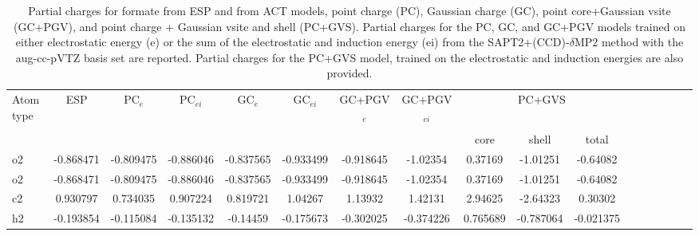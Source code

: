 \begin{sidewaystable}
\caption{Partial charges for formate from ESP and from ACT models, point charge (PC), Gaussian charge (GC), point core+Gaussian vsite (GC+PGV), and point charge + Gaussian vsite and shell (PC+GVS).  Partial charges for the PC, GC, and GC+PGV models trained on either electrostatic energy (e) or the sum of the electrostatic and induction energy (ei) from the SAPT2+(CCD)-$\delta$MP2 method with the aug-cc-pVTZ basis set are reported. Partial charges for the PC+GVS model, trained on the electrostatic and induction energies are also provided.}
\hspace{-1cm}
\begin{tabular}{lcccccccccccccccc}
\hline
 Atom type & ESP & PC$_{e}$ & PC$_{ei}$ & GC$_{e}$ & GC$_{ei}$ & GC+PGV$_{e}$ & GC+PGV$_{ei}$ & \multicolumn{3}{c}{PC+GVS} \\\\
 & & & & & & & & core & shell & total \\
\hline
 o2 & -0.868471 & -0.809475 & -0.886046 & -0.837565 &  -0.933499 & -0.918645 &  -1.02354 & 0.37169 & -1.01251 & -0.64082 \\
 o2 & -0.868471 & -0.809475 & -0.886046 & -0.837565 &  -0.933499 & -0.918645 &  -1.02354 & 0.37169 & -1.01251 & -0.64082 \\
 c2 & 0.930797 & 0.734035 & 0.907224 & 0.819721 &  1.04267 & 1.13932 &  1.42131 & 2.94625 & -2.64323 & 0.30302 \\
 h2 & -0.193854 & -0.115084 & -0.135132 & -0.14459 &  -0.175673 & -0.302025 &  -0.374226 & 0.765689 & -0.787064 & -0.021375 \\
\hline
\end{tabular}
\end{sidewaystable}
